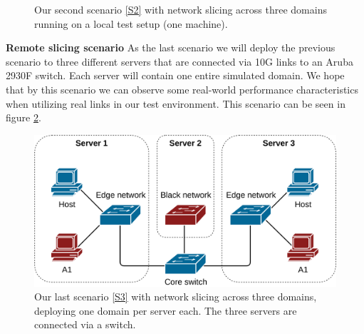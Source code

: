\begin{description}[style=multiline, labelwidth=0.7cm]
\begin{figure}[ht]
        \caption[Validation Scenario 2]{Our second scenario \ref{S2} with network slicing across three domains running on a local test setup (one machine).}
        \label{fig:scenario_2}
    \end{figure}
    \item[\namedlabel{S3}{S3}] \textbf{Remote slicing scenario} As the last scenario we will deploy the previous scenario to three different servers that are connected via 10G links to an Aruba 2930F switch. Each server will contain one entire simulated domain. We hope that by this scenario we can observe some real-world performance characteristics when utilizing real links in our test environment. This scenario can be seen in figure \ref{fig:scenario_3}.
    \begin{figure}[ht]
        \centering
        \includegraphics[width=\textwidth]{images/chapter_4/scenario_3.png}
        \caption[Validation Scenario 3]{Our last scenario \ref{S3} with network slicing across three domains, deploying one domain per server each. The three servers are connected via a switch.}
        \label{fig:scenario_3}
    \end{figure}
\end{description}



